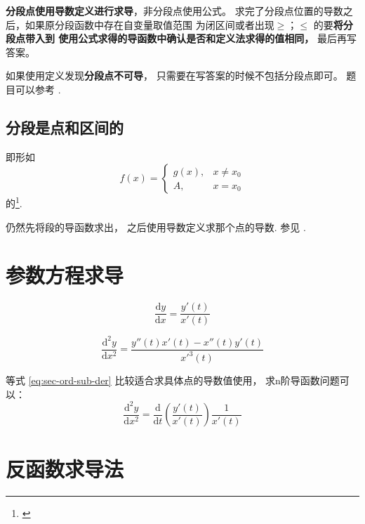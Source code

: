 \textbf{分段点使用导数定义进行求导}，非分段点使用公式。
求完了分段点位置的导数之后，如果原分段函数中存在自变量取值范围
为闭区间或者出现$\geq$；$\leq$ 的要\textbf{将分段点带入到
使用公式求得的导函数中确认是否和定义法求得的值相同，}
最后再写答案。

如果使用定义发现\textbf{分段点不可导}，
只需要在写答案的时候不包括分段点即可。
题目可以参考 \cite[quest26]{w660}.

\subsection{分段是点和区间的}

即形如
\[
    f(x) = 
    \left\{
        \begin{array}{rl}
            g(x),&x \neq x_0 \\
            A, &x = x_0
        \end{array}
    \right. 
\]
的\footnote{\cite[page 16]{w660ans}}.

仍然先将段的导函数求出，
之后使用导数定义求那个点的导数.
参见 \cite[quest27]{w660}.

\section{参数方程求导}

\begin{lemma}
    \begin{equation}
        \dfrac{\mbox{d}y}{\mbox{d}x} = \dfrac{y'(t)}{x'(t)}
    \end{equation}

    \begin{equation}\label{eq:sec-ord-sub-der}
        \dfrac{\mbox{d}^2 y}{\mbox{d}x^2} = \dfrac{y''(t) x'(t) -x''(t) y'(t)}{x'^3(t)}
    \end{equation}

    等式 \ref{eq:sec-ord-sub-der} 比较适合求具体点的导数值使用，
    求n阶导函数问题可以：
    \begin{equation}
        \dfrac{\mbox{d}^2y}{\mbox{d}x^2} = 
        \dfrac{\mbox{d}}{\mbox{d}t} 
        \left(
            \dfrac{y'(t)}{x'(t)} 
        \right)
        \dfrac{1}{x'(t)}
    \end{equation}
\end{lemma}

\section{反函数求导法}

